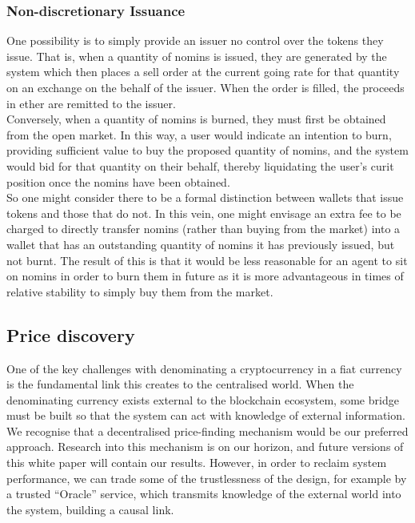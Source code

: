 \subsubsection{Non-discretionary Issuance}

One possibility is to simply provide an issuer no control over the tokens they issue. That is, when a quantity of nomins is issued, they are generated by the system which then places a sell order at the current going rate for that quantity on an exchange on the behalf of the issuer. When the order is filled, the proceeds in ether are remitted to the issuer. \\

\noindent Conversely, when a quantity of nomins is burned, they must first be obtained from the open market. In this way, a user would indicate an intention to burn, providing sufficient value to buy the proposed quantity of nomins, and the system would bid for that quantity on their behalf, thereby liquidating the user's curit position once the nomins have been obtained. \\

\noindent So one might consider there to be a formal distinction between wallets that issue tokens and those that do not. In this vein, one might envisage an extra fee to be charged to directly transfer nomins (rather than buying from the market) into a wallet that has an outstanding quantity of nomins it has previously issued, but not burnt. The result of this is that it would be less reasonable for an agent to sit on nomins in order to burn them in future as it is more advantageous in times of relative stability to simply buy them from the market. \\

\pagebreak 

\subsection{Price discovery}

One of the key challenges with denominating a cryptocurrency in a fiat currency is the
fundamental link this creates to the centralised world. When the denominating currency exists
external to the blockchain ecosystem, some bridge must be built so that the system can act with
knowledge of external information.
We recognise that a decentralised price-finding mechanism would be our preferred approach.
Research into this mechanism is on our horizon, and future versions of this white paper will contain
our results.
However, in order to reclaim system performance, we can trade some of the trustlessness of the design, for example by
a trusted ``Oracle'' service, which transmits knowledge of the external world into the system, building a causal link.



